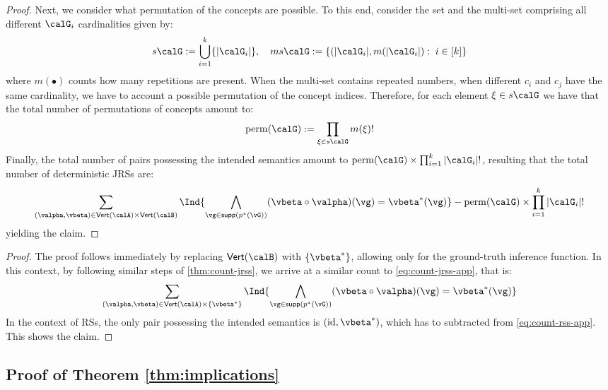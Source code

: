 \begin{proof}
    Next, we consider what permutation of the concepts are possible. To this end, consider the set and the multi-set comprising all different $\calG_i$ cardinalities given by:
    \[
        s\calG := \bigcup_{i=1}^k \{ |\calG_i| \} , 
        \quad
        ms\calG := \{( |\calG_i|, m(|\calG_i|): \; i \in [k]  \}
    \]
    where $m(\bullet)$ counts how many repetitions are present.
    When the multi-set contains repeated numbers, \ie when different $c_i$ and $c_j$ have the same cardinality, we have to account a possible permutation of the concept indices. Therefore, for each element $\xi \in s\calG$ we have that the total number of permutations of concepts amount to:
    \[
        \mathrm{perm}(\calG) :=
        \prod_{ \xi \in s\calG} m(\xi)!
    \]
    Finally, the total number of pairs possessing the intended semantics amount to $ \mathrm{perm}(\calG) \times \prod_{i=1}^k |\calG_i|!$, resulting that the total number of deterministic JRSs are:
    \[
        \sum_{(\valpha, \vbeta) \in \Vset{\calA} \times \Vset{\calB}} 
        \Ind{
            \bigwedge_{\vg \in \mathsf{supp} (p^*(\vG)) } (\vbeta \circ \valpha) ( \vg) = \vbeta^* (\vg)
        } - \mathrm{perm}(\calG) \times \prod_{i=1}^k |\calG_i|!
    \]
    yielding the claim.
\end{proof}


\countrss*

\begin{proof}
    The proof follows immediately by replacing $\Vset{\calB}$ with $\{\vbeta^*\}$, allowing only for the ground-truth inference function. In this context, by following similar steps of \cref{thm:count-jrss}, we arrive at a similar count to \cref{eq:count-jrss-app}, that is:
    \[
        \sum_{(\valpha, \vbeta) \in \Vset{\calA} \times \{ \vbeta^*\}
        } 
        \Ind{
            \bigwedge_{\vg \in \mathsf{supp} (p^*(\vG)) } (\vbeta \circ \valpha) ( \vg) = \vbeta^* (\vg)
        } \label{eq:count-rss-app}
    \]
    In the context of RSs, the only pair possessing the intended semantics is $(\id, \vbeta^*)$, which has to subtracted from \cref{eq:count-rss-app}. This shows the claim.
\end{proof}

\subsection{Proof of Theorem \ref{thm:implications}}

\thmimplications*






